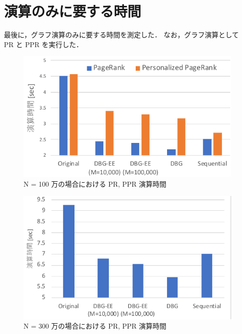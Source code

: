 \section{演算のみに要する時間}
最後に，グラフ演算のみに要する時間を測定した．
なお，グラフ演算として PR と PPR を実行した．
\label{algo_time}
\begin{figure}[t]
  \centering
  \includegraphics[width=0.8\linewidth]{./figure/algo_time_1000000.pdf}
  \caption{N = 100 万の場合における PR, PPR 演算時間}
  \label{algo_time_1000000}
\end{figure}
\begin{figure}[t]
  \centering
  \includegraphics[width=0.8\linewidth]{./figure/algo_time_3000000.pdf}
  \caption{N = 300 万の場合における PR, PPR 演算時間}
  \label{algo_time_3000000}
\end{figure}